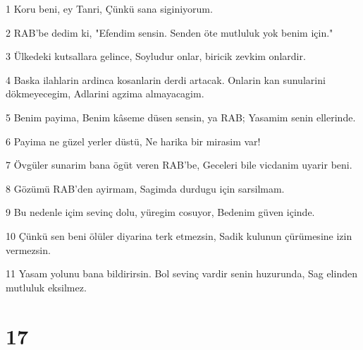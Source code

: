 \par 1 Koru beni, ey Tanri, Çünkü sana siginiyorum.
\par 2 RAB'be dedim ki, "Efendim sensin. Senden öte mutluluk yok benim için."
\par 3 Ülkedeki kutsallara gelince, Soyludur onlar, biricik zevkim onlardir.
\par 4 Baska ilahlarin ardinca kosanlarin derdi artacak. Onlarin kan sunularini dökmeyecegim, Adlarini agzima almayacagim.
\par 5 Benim payima, Benim kâseme düsen sensin, ya RAB; Yasamim senin ellerinde.
\par 6 Payima ne güzel yerler düstü, Ne harika bir mirasim var!
\par 7 Övgüler sunarim bana ögüt veren RAB'be, Geceleri bile vicdanim uyarir beni.
\par 8 Gözümü RAB'den ayirmam, Sagimda durdugu için sarsilmam.
\par 9 Bu nedenle içim sevinç dolu, yüregim cosuyor, Bedenim güven içinde.
\par 10 Çünkü sen beni ölüler diyarina terk etmezsin, Sadik kulunun çürümesine izin vermezsin.
\par 11 Yasam yolunu bana bildirirsin. Bol sevinç vardir senin huzurunda, Sag elinden mutluluk eksilmez.

\chapter{17}

